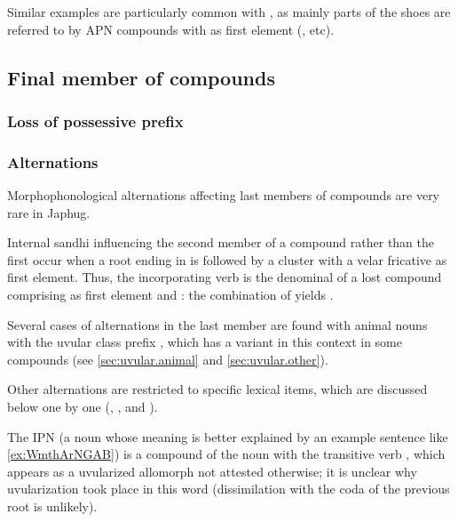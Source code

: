Similar examples are particularly common with , as mainly parts of the shoes are referred to by APN compounds with  as first element (,  etc).

\subsection{Final member of compounds} \label{sec:final.compounds}
\subsubsection{Loss of possessive prefix} \label{sec:possessive.prefix.second.compounds}

\subsubsection{Alternations} \label{sec:second.member.alternation} 
Morphophonological alternations affecting last members of compounds are very rare in Japhug. 

Internal sandhi influencing the second member of a compound rather than the first occur when a root ending in  is followed by a cluster with a velar fricative as first element. Thus, the incorporating verb  is the denominal of a lost compound  comprising  as first element and : the combination of  yields .

Several cases of alternations in the last member are found with animal nouns with the uvular class prefix , which has a variant  in this context in some compounds (see \ref{sec:uvular.animal} and \ref{sec:uvular.other}). 

Other alternations are restricted to specific lexical items, which are discussed below one by one (, ,  and ).

The IPN  (a noun whose meaning is better explained by an example sentence like \ref{ex:WmthArNGAB}) is a compound of the noun  with the transitive verb , which appears as a uvularized allomorph  not attested otherwise; it is unclear why uvularization took place in this word (dissimilation with the coda  of the previous root is unlikely).

